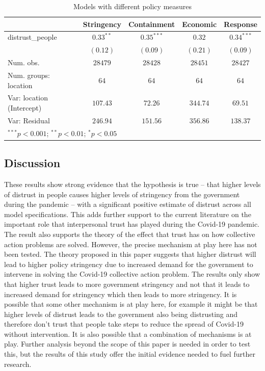 \documentclass[
  11pt,
]{article}
\begin{document}
\begin{table}
\caption{Models with different policy measures}
\begin{center}
\begin{tabular}{l c c c c}
\hline
 & Stringency & Containment & Economic & Response \\
\hline
distrust\_people          & $0.33^{**}$ & $0.35^{***}$ & $0.32$   & $0.34^{***}$ \\
                          & $(0.12)$    & $(0.09)$     & $(0.21)$ & $(0.09)$     \\
\hline
Num. obs.                 & $28479$     & $28428$      & $28451$  & $28427$      \\
Num. groups: location     & $64$        & $64$         & $64$     & $64$         \\
Var: location (Intercept) & $107.43$    & $72.26$      & $344.74$ & $69.51$      \\
Var: Residual             & $246.94$    & $151.56$     & $356.86$ & $138.37$     \\
\hline
\multicolumn{5}{l}{\scriptsize{$^{***}p<0.001$; $^{**}p<0.01$; $^{*}p<0.05$}}
\end{tabular}
\label{tab:policy}
\end{center}
\end{table}

\hypertarget{discussion}{%
\subsection{Discussion}\label{discussion}}

These results show strong evidence that the hypothesis is true -- that higher levels of distrust in people causes higher levels of stringency from the government during the pandemic -- with a significant positive estimate of distrust across all model specifications. This adds further support to the current literature on the important role that interpersonal trust has played during the Covid-19 pandemic. The result also supports the theory of the effect that trust has on how collective action problems are solved. However, the precise mechanism at play here has not been tested. The theory proposed in this paper suggests that higher distrust will lead to higher policy stringency due to increased demand for the government to intervene in solving the Covid-19 collective action problem. The results only show that higher trust leads to more government stringency and not that it leads to increased demand for stringency which then leads to more stringency. It is possible that some other mechanism is at play here, for example it might be that higher levels of distrust leads to the government also being distrusting and therefore don't trust that people take steps to reduce the spread of Covid-19 without intervention. It is also possible that a combination of mechanisms is at play. Further analysis beyond the scope of this paper is needed in order to test this, but the results of this study offer the initial evidence needed to fuel further research.\\
\end{document}
